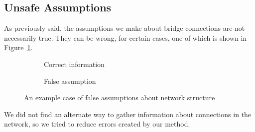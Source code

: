 \subsection{Unsafe Assumptions}
\label{unsafe_assumptions}
As previously said, the assumptions we make about bridge connections are not necessarily true.
They can be wrong, for certain cases, one of which is shown in Figure~\ref{fig:false_example}.
\begin{figure}[h]
    \begin{subfigure}[b]{0.4\textwidth}
        \caption{Correct information}
    \end{subfigure}
    \hspace{1cm}
    \begin{subfigure}[b]{0.4\textwidth}
        \caption{False assumption}
    \end{subfigure}

    \caption{An example case of false assumptions about network structure}
    \label{fig:false_example}
\end{figure}
We did not find an alternate way to gather information about connections in the network, so we tried to reduce errors created by our method.
